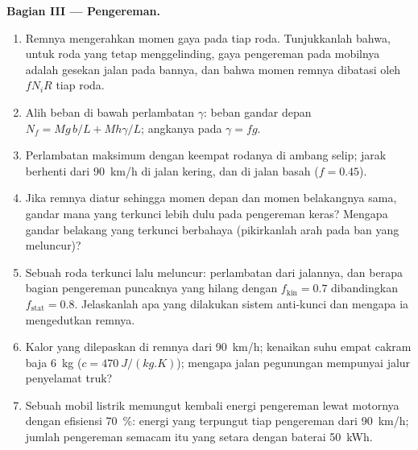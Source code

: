 \begin{problem}
\medskip
\noindent\textbf{Bagian III --- Pengereman.}
\begin{enumerate}[resume]
  \item Remnya mengerahkan momen gaya pada tiap roda. Tunjukkanlah
        bahwa, untuk roda yang tetap menggelinding, gaya pengereman
        pada mobilnya adalah gesekan jalan pada bannya, dan bahwa
        momen remnya dibatasi oleh $fN_iR$ tiap roda.
  \item Alih beban di bawah perlambatan $\gamma$: beban gandar depan
        $N_f = Mg\,b/L + Mh\gamma/L$; angkanya pada $\gamma = fg$.
  \item Perlambatan maksimum dengan keempat rodanya di ambang selip;
        jarak berhenti dari \qty{90}{km/h} di jalan kering, dan di
        jalan basah ($f = 0.45$).
  \item Jika remnya diatur sehingga momen depan dan momen belakangnya
        sama, gandar mana yang terkunci lebih dulu pada pengereman
        keras? Mengapa gandar belakang yang terkunci berbahaya
        (pikirkanlah arah  pada ban yang meluncur)?
  \item Sebuah roda terkunci lalu meluncur: perlambatan dari jalannya,
        dan berapa bagian pengereman puncaknya yang hilang dengan
        $f_{\text{kin}} =
        0.7$ dibandingkan $f_{\text{stat}} = 0.8$. Jelaskanlah apa yang
        dilakukan sistem anti-kunci dan mengapa ia mengedutkan remnya.
  \item Kalor yang dilepaskan di remnya dari \qty{90}{km/h}; kenaikan
        suhu empat cakram baja \qty{6}{kg} ($c = \qty{470}{J/(kg.K)}$);
        mengapa jalan pegunungan mempunyai jalur penyelamat truk?
  \item Sebuah mobil listrik memungut kembali energi pengereman lewat
        motornya dengan efisiensi \qty{70}{\%}: energi yang terpungut
        tiap pengereman dari \qty{90}{km/h}; jumlah pengereman semacam
        itu yang setara dengan baterai \qty{50}{kWh}.
\end{enumerate}


\end{problem}
